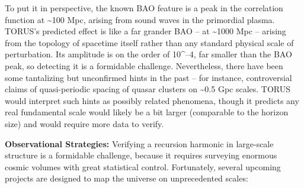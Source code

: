 \documentclass[]{article}
\begin{document}
To put it in perspective, the known BAO feature is a peak in the
correlation function at \textasciitilde{}100 Mpc, arising from sound
waves in the primordial plasma. TORUS's predicted effect is like a far
grander BAO -- at \textasciitilde{}1000 Mpc -- arising from the topology
of spacetime itself rather than any standard physical scale of
perturbation. Its amplitude is on the order of 10\^{}--4, far smaller
than the BAO peak, so detecting it is a formidable challenge.
Nevertheless, there have been some tantalizing but unconfirmed hints in
the past -- for instance, controversial claims of quasi-periodic spacing
of quasar clusters on \textasciitilde{}0.5 Gpc scales. TORUS would
interpret such hints as possibly related phenomena, though it predicts
any real fundamental scale would likely be a bit larger (comparable to
the horizon size) and would require more data to verify.

\textbf{Observational Strategies:} Verifying a recursion harmonic in
large-scale structure is a formidable challenge, because it requires
surveying enormous cosmic volumes with great statistical control.
Fortunately, several upcoming projects are designed to map the universe
on unprecedented scales:
\end{document}

